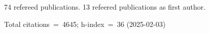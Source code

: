 74 refereed publications. 13 refeered publications as first author.

Total citations~=~4645; h-index~=~36 (2025-02-03)